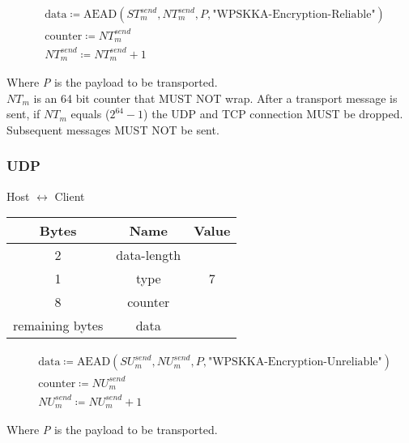 \begin{align*}
    & \text{data} \coloneqq \text{AEAD}(\mathit{ST}_{m}^{send},\mathit{NT}_{m}^{send}, P,
    \text{"WPSKKA-Encryption-Reliable"})\\
    & \text{counter} \coloneqq \mathit{NT}_{m}^{send}\\
    & \mathit{NT}_{m}^{send} \coloneqq \mathit{NT}_{m}^{send} + 1
\end{align*}


Where \emph{P} is the payload to be transported.\\

$\mathit{NT}_{m}$ is an 64 bit counter that MUST NOT wrap. After a transport message is sent, if $\mathit{NT}_{m}$ equals
($2^{64}-1$) the UDP and TCP connection MUST be dropped. Subsequent messages MUST NOT be sent. \\

\subsubsection{UDP}

\begin{center}
    Host $\leftrightarrow$ Client\\
    \begin{tabular}{|c|c|c|}
        \hline
        \textbf{Bytes}  & \textbf{Name} & \textbf{Value} \\
        \hline
        2               & data-length   &                \\
        \hline
        1               & type          & 7              \\
        \hline
        8               & counter       &                \\
        \hline
        remaining bytes & data          &                \\
        \hline
    \end{tabular}
\end{center}

\begin{align*}
    & \text{data} \coloneqq \text{AEAD}(\mathit{SU}_{m}^{send},\mathit{NU}_{m}^{send}, P,
    \text{"WPSKKA-Encryption-Unreliable"})\\
    & \text{counter} \coloneqq \mathit{NU}_{m}^{send}\\
    & \mathit{NU}_{m}^{send} \coloneqq \mathit{NU}_{m}^{send} + 1
\end{align*}


Where \emph{P} is the payload to be transported.\\

